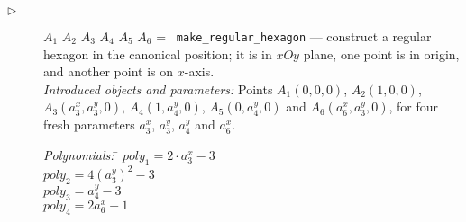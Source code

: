 \documentclass{article}
\begin{document}
\begin{description}
\item[$\triangleright$] $A_1$ $A_2$ $A_3$ $A_4$ $A_5$ $A_6$ = {\tt
    make\_regular\_hexagon} --- construct a regular hexagon in the
  canonical position; it is in $xOy$ plane, one point is in origin,
  and another
  point is on $x$-axis. \\
  {\em Introduced objects and parameters:} Points $A_1(0, 0, 0)$,
  $A_2(1, 0, 0)$, $A_3(a_3^x, a_3^y, 0)$, $A_4(1, a_4^y, 0)$,
  $A_5(0, a_4^y, 0)$ and $A_6(a_6^x, a_3^y, 0)$, for four fresh
  parameters $a_3^x$, $a_3^y$, $a_4^y$ and $a_6^x$.

\begin{tabbing}
{\em Polynomials:} \= $poly_1 = 2\cdot a_3^x - 3$ \\
                   \> $poly_2 = 4(a_3^y)^2 - 3$ \\
                   \> $poly_3 = a_4^y - 3$ \\
                   \> $poly_4 = 2a_6^x - 1$
\end{tabbing}
\end{description}
\end{document}
